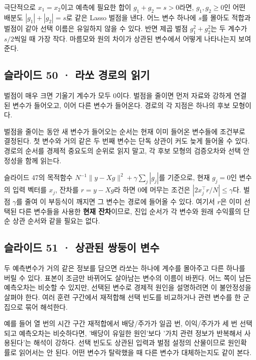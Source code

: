 \documentclass[11pt,a4paper]{article}
\begin{document}
극단적으로 $x_1=x_2$이고 예측에 필요한 합이 $g_1+g_2=s>0$라면, $g_1,g_2\ge0$인 어떤 배분도 $|g_1|+|g_2|=s$로 같은 Lasso 벌점을 낸다. 어느 변수 하나에 $s$를 몰아도 적합과 벌점이 같아 선택 이름은 유일하지 않을 수 있다. 반면 제곱 벌점 $g_1^2+g_2^2$는 두 계수가 $s/2$씩일 때 가장 작다. 마름모와 원의 차이가 상관된 변수에서 어떻게 나타나는지 보여 준다.\par

\subsection{슬라이드 50 · 라쏘 경로의 읽기}
벌점이 매우 크면 기울기 계수가 모두 0이다. 벌점을 줄이면 먼저 자료와 강하게 연결된 변수가 들어오고, 이어 다른 변수가 들어온다. 경로의 각 지점은 하나의 후보 모형이다.\par

벌점을 줄이는 동안 새 변수가 들어오는 순서는 현재 이미 들어온 변수들에 조건부로 결정된다. 첫 변수와 거의 같은 두 번째 변수는 단독 상관이 커도 늦게 들어올 수 있다. 경로의 순서를 경제적 중요도의 순위로 읽지 말고, 각 후보 모형의 검증오차와 선택 안정성을 함께 읽는다.\par

슬라이드 47의 목적함수 $N^{-1}\|y-Xg\|^2+\gamma\sum_j|g_j|$를 기준으로, 현재 $g_j=0$인 변수의 입력 벡터를 $x_j$, 잔차를 $r=y-Xg$라 하면 0에 머무는 조건은 $|2x_j^\top r/N|\le\gamma$다. 벌점 $\gamma$를 줄여 이 부등식이 깨지면 그 변수는 경로에 들어올 수 있다. 여기서 $r$은 이미 선택된 다른 변수들을 사용한 \textbf{현재 잔차}이므로, 진입 순서가 각 변수와 원래 수익률의 단순 상관 순서와 같을 필요는 없다.\par

\subsection{슬라이드 51 · 상관된 쌍둥이 변수}
두 예측변수가 거의 같은 정보를 담으면 라쏘는 하나에 계수를 몰아주고 다른 하나를 버릴 수 있다. 표본이 조금만 바뀌어도 살아남는 변수의 이름이 바뀐다. 어느 쪽이 남든 예측오차는 비슷할 수 있지만, 선택된 변수로 경제적 원인을 설명하려면 이 불안정성을 살펴야 한다. 여러 훈련 구간에서 재적합해 선택 빈도를 비교하거나 관련 변수를 한 군집으로 묶어 해석한다.\par

예를 들어 열 번의 시간 구간 재적합에서 배당/주가가 일곱 번, 이익/주가가 세 번 선택되고 예측오차는 비슷하다면, '배당이 유일한 원인'보다 '가치 관련 정보가 반복해서 사용된다'는 해석이 강하다. 선택 빈도도 상관된 입력과 벌점 설정의 산물이므로 원인확률로 읽어서는 안 된다. 어떤 변수가 탈락했을 때 다른 변수가 대체하는지도 같이 본다.\par
\end{document}
